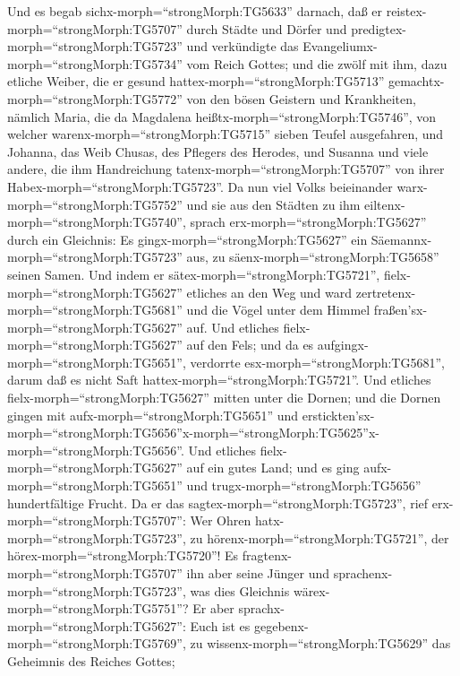  Und es begab sichx-morph=``strongMorph:TG5633'' darnach,
daß er reistex-morph=``strongMorph:TG5707'' durch Städte und Dörfer und
predigtex-morph=``strongMorph:TG5723'' und verkündigte das
Evangeliumx-morph=``strongMorph:TG5734'' vom Reich Gottes; und die zwölf
mit ihm,  dazu etliche Weiber, die er gesund
hattex-morph=``strongMorph:TG5713''
gemachtx-morph=``strongMorph:TG5772'' von den bösen Geistern und
Krankheiten, nämlich Maria, die da Magdalena
heißtx-morph=``strongMorph:TG5746'', von welcher
warenx-morph=``strongMorph:TG5715'' sieben Teufel ausgefahren,
 und Johanna, das Weib Chusas, des Pflegers des Herodes, und
Susanna und viele andere, die ihm Handreichung
tatenx-morph=``strongMorph:TG5707'' von ihrer
Habex-morph=``strongMorph:TG5723''.  Da nun viel Volks
beieinander warx-morph=``strongMorph:TG5752'' und sie aus den Städten zu
ihm eiltenx-morph=``strongMorph:TG5740'', sprach
erx-morph=``strongMorph:TG5627'' durch ein Gleichnis:  Es
gingx-morph=``strongMorph:TG5627'' ein
Säemannx-morph=``strongMorph:TG5723'' aus, zu
säenx-morph=``strongMorph:TG5658'' seinen Samen. Und indem er
sätex-morph=``strongMorph:TG5721'', fielx-morph=``strongMorph:TG5627''
etliches an den Weg und ward zertretenx-morph=``strongMorph:TG5681'' und
die Vögel unter dem Himmel fraßen'sx-morph=``strongMorph:TG5627'' auf.
 Und etliches fielx-morph=``strongMorph:TG5627'' auf den
Fels; und da es aufgingx-morph=``strongMorph:TG5651'', verdorrte
esx-morph=``strongMorph:TG5681'', darum daß es nicht Saft
hattex-morph=``strongMorph:TG5721''.  Und etliches
fielx-morph=``strongMorph:TG5627'' mitten unter die Dornen; und die
Dornen gingen mit aufx-morph=``strongMorph:TG5651'' und
erstickten'sx-morph=``strongMorph:TG5656''\textbar x-morph=``strongMorph:TG5625''x-morph=``strongMorph:TG5656''.
 Und etliches fielx-morph=``strongMorph:TG5627'' auf ein
gutes Land; und es ging aufx-morph=``strongMorph:TG5651'' und
trugx-morph=``strongMorph:TG5656'' hundertfältige Frucht. Da er das
sagtex-morph=``strongMorph:TG5723'', rief
erx-morph=``strongMorph:TG5707'': Wer Ohren
hatx-morph=``strongMorph:TG5723'', zu
hörenx-morph=``strongMorph:TG5721'', der
hörex-morph=``strongMorph:TG5720''!  Es
fragtenx-morph=``strongMorph:TG5707'' ihn aber seine Jünger und
sprachenx-morph=``strongMorph:TG5723'', was dies Gleichnis
wärex-morph=``strongMorph:TG5751''?  Er aber
sprachx-morph=``strongMorph:TG5627'': Euch ist es
gegebenx-morph=``strongMorph:TG5769'', zu
wissenx-morph=``strongMorph:TG5629'' das Geheimnis des Reiches Gottes;
